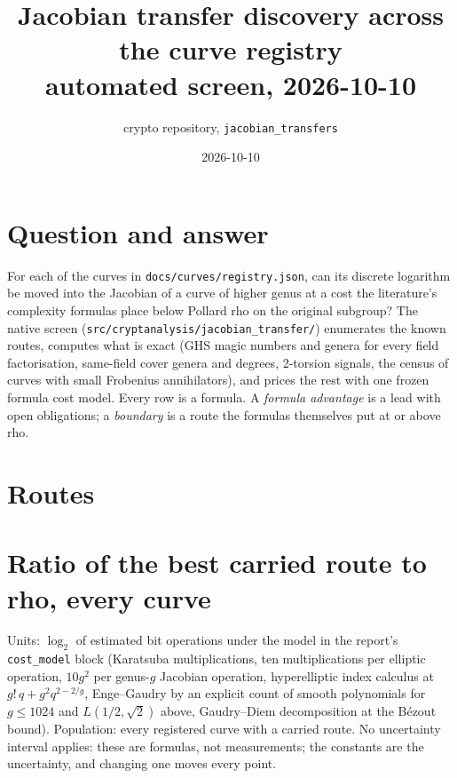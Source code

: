 \documentclass[10pt]{article}
\title{Jacobian transfer discovery across the curve registry\\ \large automated screen, 2026-10-10}
\author{crypto repository, \texttt{jacobian\_transfers}}
\date{2026-10-10}
\begin{document}
\maketitle

\section*{Question and answer}
For each of the \textbf{} curves in \texttt{docs/curves/registry.json}, can its discrete
logarithm be moved into the Jacobian of a curve of higher genus at a cost the literature's
complexity formulas place below Pollard rho on the original subgroup?  The native screen
(\texttt{src/cryptanalysis/jacobian\_transfer/}) enumerates the known routes, computes what
is exact (GHS magic numbers and genera for every field factorisation, same-field cover
genera and degrees, 2-torsion signals, the census of curves with small Frobenius
annihilators), and prices the rest with one frozen formula cost model.  Every row is a
formula.  A \emph{formula advantage} is a lead with open obligations; a \emph{boundary}
is a route the formulas themselves put at or above rho.

\section*{Routes}
\begin{center}
\resizebox{\textwidth}{!}{}
\end{center}

\section*{Ratio of the best carried route to rho, every curve}
\begin{center}
\resizebox{\textwidth}{!}{}
\end{center}
\noindent Units: $\log_2$ of estimated bit operations under the model in the report's
\texttt{cost\_model} block (Karatsuba multiplications, ten multiplications per elliptic
operation, $10g^2$ per genus-$g$ Jacobian operation, hyperelliptic index calculus at
$g!\,q + g^2 q^{2-2/g}$, Enge--Gaudry by an explicit count of smooth polynomials for $g\le1024$
and $L(1/2,\sqrt2)$ above, Gaudry--Diem decomposition at the B\'ezout bound).  Population: every registered curve with a carried route.  No
uncertainty interval applies: these are formulas, not measurements; the constants are the
uncertainty, and changing one moves every point.
\end{document}
